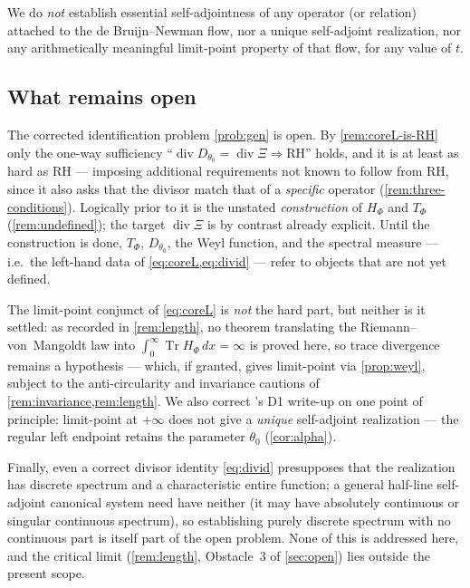 \documentclass[12pt,a4paper]{amsart}
\theoremstyle{plain}
\theoremstyle{definition}
\newcommand{\Tr}{\operatorname{Tr}}
\newcommand{\Ham}{H}
\begin{document}
We do \emph{not} establish essential self-adjointness of any operator (or
relation) attached to the de Bruijn--Newman flow, nor a unique
self-adjoint realization, nor any arithmetically meaningful limit-point
property of that flow, for any value of $t$.

\subsection{What remains open}

The corrected identification problem \cref{prob:gen} is open.  By
\cref{rem:coreL-is-RH} only the one-way sufficiency
``$\operatorname{div}D_{\theta_0}=\operatorname{div}\Xi\Rightarrow$RH''
holds, and it is at least as hard as RH --- imposing additional
requirements not known to follow from RH, since it also asks that the
divisor match that of a \emph{specific} operator
(\cref{rem:three-conditions}).  Logically prior to it is the
unstated \emph{construction} of $\Ham_\Phi$ and $T_\Phi$
(\cref{rem:undefined}); the target $\operatorname{div}\Xi$ is by contrast
already explicit.  Until the construction is done, $T_\Phi$,
$D_{\theta_0}$, the Weyl function, and the spectral measure --- i.e.\ the
left-hand data of \cref{eq:coreL,eq:divid} --- refer to objects that are
not yet defined.

The limit-point conjunct of \cref{eq:coreL} is \emph{not} the hard part,
but neither is it settled: as recorded in \cref{rem:length}, no theorem
translating the Riemann--von~Mangoldt law into
$\int_0^\infty\Tr\Ham_\Phi\,dx=\infty$ is proved here, so trace divergence
remains a hypothesis --- which, if granted, gives limit-point via
\cref{prop:weyl}, subject to the anti-circularity and invariance cautions
of \cref{rem:invariance,rem:length}.  We also correct
\cite{SpecRoadmap}'s D1 write-up on one point of principle: limit-point at
$+\infty$ does not give a \emph{unique} self-adjoint realization --- the
regular left endpoint retains the parameter $\theta_0$ (\cref{cor:alpha}).

Finally, even a correct divisor identity \cref{eq:divid} presupposes that
the realization has discrete spectrum and a characteristic entire
function; a general half-line self-adjoint canonical system need have
neither (it may have absolutely continuous or singular continuous
spectrum), so establishing purely discrete spectrum with no continuous
part is itself part of the open problem.  None of this is addressed here,
and the critical limit (\cref{rem:length}, Obstacle~3 of \cref{sec:open})
lies outside the present scope.
\end{document}
